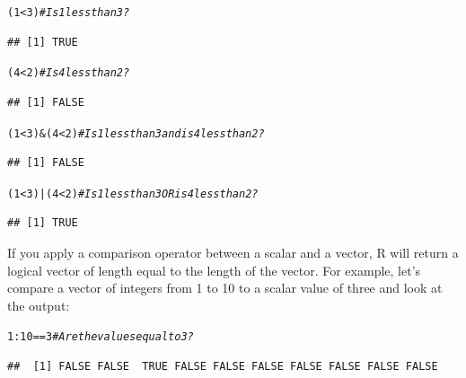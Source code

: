 \documentclass{tufte-book}\usepackage[]{graphicx}\usepackage[]{color}
\makeatletter
\newcommand{\hlnum}[1]{\textcolor[rgb]{0.686,0.059,0.569}{#1}}%
\newcommand{\hlcom}[1]{\textcolor[rgb]{0.678,0.584,0.686}{\textit{#1}}}%
\newcommand{\hlopt}[1]{\textcolor[rgb]{0,0,0}{#1}}%
\newcommand{\hlstd}[1]{\textcolor[rgb]{0.345,0.345,0.345}{#1}}%
\newenvironment{kframe}{%
 \def\at@end@of@kframe{}%
 \ifinner\ifhmode%
  \def\at@end@of@kframe{\end{minipage}}%
  \begin{minipage}{\columnwidth}%
 \fi\fi%
 \def\FrameCommand##1{\hskip\@totalleftmargin \hskip-\fboxsep
 \colorbox{shadecolor}{##1}\hskip-\fboxsep
     \hskip-\linewidth \hskip-\@totalleftmargin \hskip\columnwidth}%
 \MakeFramed {\advance\hsize-\width
   \@totalleftmargin\z@ \linewidth\hsize
   \@setminipage}}%
 {\par\unskip\endMakeFramed%
 \at@end@of@kframe}
\newenvironment{knitrout}{}{} %
\makeatother
\begin{document}
\begin{footnotesize}
\begin{footnotesize}
\begin{knitrout}
\color{fgcolor}\begin{kframe}
\begin{alltt}
\hlstd{(}\hlnum{1} \hlopt{<} \hlnum{3}\hlstd{)} \hlcom{# Is 1 less than 3?}
\end{alltt}
\begin{verbatim}
## [1] TRUE
\end{verbatim}
\begin{alltt}
\hlstd{(}\hlnum{4} \hlopt{<} \hlnum{2}\hlstd{)} \hlcom{# Is 4 less than 2?}
\end{alltt}
\begin{verbatim}
## [1] FALSE
\end{verbatim}
\begin{alltt}
\hlstd{(}\hlnum{1} \hlopt{<} \hlnum{3}\hlstd{)} \hlopt{&} \hlstd{(}\hlnum{4} \hlopt{<} \hlnum{2}\hlstd{)} \hlcom{# Is 1 less than 3 and is 4 less than 2?}
\end{alltt}
\begin{verbatim}
## [1] FALSE
\end{verbatim}
\begin{alltt}
\hlstd{(}\hlnum{1} \hlopt{<} \hlnum{3}\hlstd{)} \hlopt{|} \hlstd{(}\hlnum{4} \hlopt{<} \hlnum{2}\hlstd{)} \hlcom{# Is 1 less than 3 OR is 4 less than 2?}
\end{alltt}
\begin{verbatim}
## [1] TRUE
\end{verbatim}
\end{kframe}
\end{knitrout}
\end{footnotesize}

If you apply a comparison operator between a scalar and a vector, R will return a logical vector of length equal to the length of the vector. For example, let's compare a vector of integers from 1 to 10 to a scalar value of three and look at the output:

\begin{footnotesize}
\begin{knitrout}
\color{fgcolor}\begin{kframe}
\begin{alltt}
\hlnum{1}\hlopt{:}\hlnum{10} \hlopt{==} \hlnum{3} \hlcom{# Are the values equal to 3?}
\end{alltt}
\begin{verbatim}
##  [1] FALSE FALSE  TRUE FALSE FALSE FALSE FALSE FALSE FALSE FALSE
\end{verbatim}
\end{kframe}
\end{knitrout}
\end{footnotesize}


\end{footnotesize}
\end{document}
